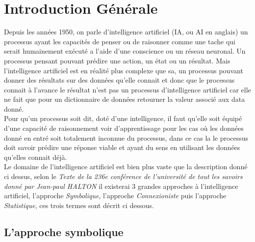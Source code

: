 \chapter{Introduction Générale}
\pagebreak

Depuis les années 1950, on parle d'intelligence artificiel (IA, ou AI en anglais) un processus ayant les capacités de penser ou de raisonner comme une tache qui serait humainement exécuté a l'aide d'une conscience ou un réseau neuronal. Un processus pensant pouvant prédire une action, un état ou un résultat. Mais l'intelligence artificiel est en réalité plus complexe que sa, un processus pouvant donner des résultats sur des données qu'elle connait et donc que le processus connait à l'avance le résultat n'est pas un processus d'intelligence artificiel car elle ne fait que pour un dictionnaire de données retourner la valeur associé aux data donné. \\
Pour qu'un processus soit dit, doté d'une intelligence, il faut qu'elle soit équipé d'une capacité de raisonnement voir d'apprentissage pour les cas où les données donné en entré soit totalement inconnue du processus, dans ce cas la le processus doit savoir prédire une réponse viable et ayant du sens en utilisant les données qu'elles connait déjà.\\
\linebreak
Le domaine de l'intelligence artificiel est bien plus vaste que la description donné ci dessus, selon le \textit{Texte de la 236e conférence de l'université de tout les savoirs donné par Jean-paul HALTON} il existerai 3 grandes approches à l'intelligence artificiel, l'approche \emph{Symbolique}, l'approche \emph{Connexioniste} puis l'approche \emph{Statistique}, ces trois termes sont décrit ci dessous.

\pagebreak
\section{L'approche symbolique}

